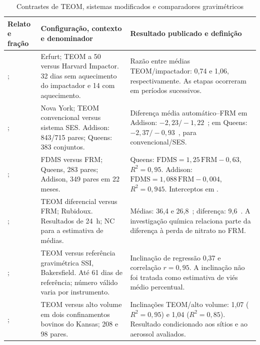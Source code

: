\begin{table}[tbp]
\caption{Contrastes de TEOM, sistemas modificados e comparadores gravimétricos}\label{tab:teom}
\begingroup\singlespacing\fontsize{10}{12}\selectfont
\begin{tabularx}{\textwidth}{@{}P{.24\textwidth}P{.30\textwidth}X@{}}
\toprule\textbf{Relato e fração} & \textbf{Configuração, contexto e denominador} & \textbf{Resultado publicado e definição}\\\midrule
\textcite{rsl201}; \MPdoiscinco{} & Erfurt; TEOM a 50~\textcelsius{} versus Harvard Impactor. 32 dias sem aquecimento do impactador e 14 com aquecimento. & Razão entre médias TEOM/impactador: 0,74 e 1,06, respectivamente. As etapas ocorreram em períodos sucessivos.\\\addlinespace
\textcite{rsl144}; \MPdoiscinco{} & Nova York; TEOM convencional versus sistema SES. Addison: 843/715 pares; Queens: 383 conjuntos. & Diferença média automático--FRM em Addison: $-2{,}23/-1{,}22$~\ugm{}; em Queens: $-2{,}37/-0{,}93$~\ugm{}, para convencional/SES.\\\addlinespace
\textcite{rsl105}; \MPdoiscinco{} & FDMS versus FRM; Queens, 283 pares; Addison, 349 pares em 22 meses. & Queens: $\mathrm{FDMS}=1{,}25\,\mathrm{FRM}-0{,}63$, $R^2=0{,}95$. Addison: $\mathrm{FDMS}=1{,}088\,\mathrm{FRM}-0{,}004$, $R^2=0{,}945$. Interceptos em \ugm{}.\\\addlinespace
\textcite{rsl101}; \MPdoiscinco{} & TEOM diferencial versus FRM; Rubidoux. Resultados de 24~h; NC para a estimativa de médias. & Médias: 36,4 e 26,8~\ugm{}; diferença: 9,6~\ugm{}. A investigação química relaciona parte da diferença à perda de nitrato no FRM.\\\addlinespace
\textcite{rsl129}; \MPdez{} & TEOM versus referência gravimétrica SSI, Bakersfield. Até 61 dias de referência; número válido varia por instrumento. & Inclinação de regressão 0,37 e correlação $r=0{,}95$. A inclinação não foi tratada como estimativa de viés médio percentual.\\\addlinespace
\textcite{rsl106}; \MPdez{} & TEOM versus alto volume em dois confinamentos bovinos do Kansas; 208 e 98 pares. & Inclinações TEOM/alto volume: 1,07 ($R^2=0{,}95$) e 1,04 ($R^2=0{,}85$). Resultado condicionado aos sítios e ao aerossol avaliados.\\\bottomrule
\end{tabularx}
\endgroup
\end{table}
